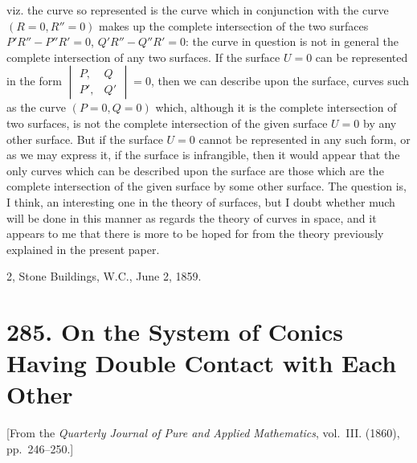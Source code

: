 \documentclass[11pt,a4paper]{article}
\theoremstyle{plain}
\begin{document}
viz. the curve so represented is the curve which in conjunction with the curve $(R = 0, R'' = 0)$ makes up the complete intersection of the two surfaces $P'R'' - P''R' = 0$, $Q'R'' - Q''R' = 0$: the curve in question is not in general the complete intersection of any two surfaces. If the surface $U = 0$ can be represented in the form $\begin{vmatrix} P, & Q \\ P', & Q' \end{vmatrix} = 0$, then we can describe upon the surface, curves such as the curve $(P = 0, Q = 0)$ which, although it is the complete intersection of two surfaces, is not the complete intersection of the given surface $U = 0$ by any other surface. But if the surface $U = 0$ cannot be represented in any such form, or as we may express it, if the surface is infrangible, then it would appear that the only curves which can be described upon the surface are those which are the complete intersection of the given surface by some other surface. The question is, I think, an interesting one in the theory of surfaces, but I doubt whether much will be done in this manner as regards the theory of curves in space, and it appears to me that there is more to be hoped for from the theory previously explained in the present paper.

\hfill 2, Stone Buildings, W.C., June 2, 1859.



\newpage
\section*{285. On the System of Conics Having Double Contact with Each Other}
\label{sec:285}

[From the \textit{Quarterly Journal of Pure and Applied Mathematics}, vol.~III. (1860), pp.~246--250.]
\end{document}
